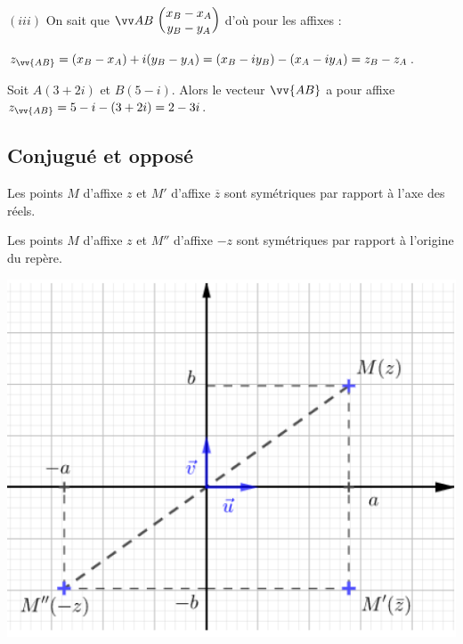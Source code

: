 \documentclass[10pt,a4paper]{article}
\begin{document}
\dem $(iii)$ On sait que $\Coord{AB}{x_B-x_A}{y_B-y_A}$ d'où pour les affixes :

$z_{\vv{AB}}=(x_B-x_A)+i(y_B-y_A)=(x_B-iy_B) - (x_A-iy_A)=z_B-z_A$. \medskip

\exe Soit $A(3 + 2i)$ et $B(5 - i)$. Alors le vecteur $\vv{AB}$ a pour affixe $z_{\vv{AB}} = 5 - i - (3 + 2i) = 2 - 3i$.

\begin{minipage}{0.6 \linewidth}
\subsection{Conjugué et opposé}

Les points $M$ d'affixe $z$ et $M'$ d'affixe $\overline{z}$ sont symétriques par rapport à l'axe des réels.

Les points $M$ d'affixe $z$ et $M''$ d'affixe $-z$ sont symétriques par rapport à l'origine du repère.
\end{minipage}
\begin{minipage}{0.35 \linewidth}
\includegraphics[width = 0.9 \linewidth]{cplx_sym.png}
\end{minipage}
\end{document}
